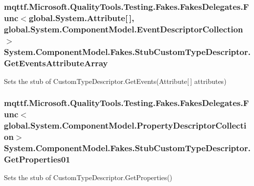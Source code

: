 \hypertarget{class_system_1_1_component_model_1_1_fakes_1_1_stub_custom_type_descriptor_a7c979a3648e4eba1e36997d861b189c3}{
\subsubsection[{Get\-Events\-Attribute\-Array}]{\setlength{\rightskip}{0pt plus 5cm}mqttf.\-Microsoft.\-Quality\-Tools.\-Testing.\-Fakes.\-Fakes\-Delegates.\-Func$<$global.\-System.\-Attribute\mbox{[}$\,$\mbox{]}, global.\-System.\-Component\-Model.\-Event\-Descriptor\-Collection$>$ System.\-Component\-Model.\-Fakes.\-Stub\-Custom\-Type\-Descriptor.\-Get\-Events\-Attribute\-Array}}\label{class_system_1_1_component_model_1_1_fakes_1_1_stub_custom_type_descriptor_a7c979a3648e4eba1e36997d861b189c3}


Sets the stub of Custom\-Type\-Descriptor.\-Get\-Events(\-Attribute\mbox{[}$\,$\mbox{]} attributes)

\hypertarget{class_system_1_1_component_model_1_1_fakes_1_1_stub_custom_type_descriptor_a05452af5f62539ef49ea6ff95e4db746}{
\subsubsection[{Get\-Properties01}]{\setlength{\rightskip}{0pt plus 5cm}mqttf.\-Microsoft.\-Quality\-Tools.\-Testing.\-Fakes.\-Fakes\-Delegates.\-Func$<$global.\-System.\-Component\-Model.\-Property\-Descriptor\-Collection$>$ System.\-Component\-Model.\-Fakes.\-Stub\-Custom\-Type\-Descriptor.\-Get\-Properties01}}\label{class_system_1_1_component_model_1_1_fakes_1_1_stub_custom_type_descriptor_a05452af5f62539ef49ea6ff95e4db746}


Sets the stub of Custom\-Type\-Descriptor.\-Get\-Properties()

